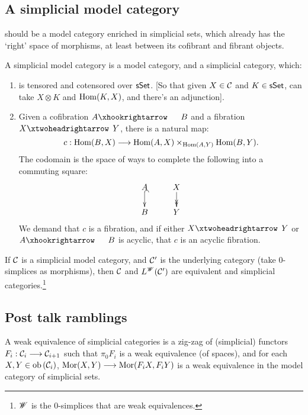 \documentclass[11pt]{article}
\begin{document}
\begin{SaulSimplicialLocalisation}
\subsection*{A simplicial model category}
should be a model category enriched in simplicial sets, which already has the `right' space of morphisms, at least between its cofibrant and fibrant objects.
\begin{defn*}
A simplicial model category is a model category, and a simplicial category, which: 
\begin{enumerate}
\item is tensored and cotensored over $\operatorname{{\mathsf{sSet}}}$. [So that given $X\in \mathcal{C}$ and $K\in\operatorname{{\mathsf{sSet}}}$, can take $X\otimes K$ and $\operatorname{Hom}(K,X)$, and there's an adjunction].
\item Given a cofibration $A\cofibration B$ and a fibration $X\fibration Y$, there is a natural map:
\[c:\operatorname{Hom}(B,X)\longrightarrow\operatorname{Hom}(A,X)\times_{\operatorname{Hom}(A,Y)}\operatorname{Hom}(B,Y).\]
The codomain is the space of ways to complete the following into a commuting square:
\[\xymatrix@R=.6cm{
A\ar@{^{(}->}[d]&X\ar@{->>}[d]\\
B&Y
}\]
We demand that $c$ is a fibration, and if either $X\fibration Y$ or $A\cofibration B$ is acyclic, that $c$ is an acyclic fibration.
\end{enumerate}
\begin{punchline}
If $\mathcal{C}$ is a simplicial model category, and $\mathcal{C}'$ is the underlying category (take $0$-simplices as morphisms), then $\mathcal{C}$ and $L^{\mathscr{W}}(\mathcal{C}')$ are equivalent and simplicial categories.\footnote{$\mathscr{W}$ is the $0$-simplices that are weak equivalences.}
\end{punchline}
\subsection*{Post talk ramblings}
A weak equivalence of simplicial categories is a zig-zag of (simplicial) functors $F_i:\mathcal{C}_i\longrightarrow\mathcal{C}_{i+1}$ such that $\pi_0F_i$ is a weak equivalence (of spaces), and for each $X,Y\in\textup{ob}\,(\mathcal{C}_i)$, $\operatorname{Mor}(X,Y)\longrightarrow\operatorname{Mor}(F_iX,F_iY)$ is a weak equivalence in the model category of simplicial sets.
\end{defn*}


\pagebreak
\end{SaulSimplicialLocalisation}
\end{document}
